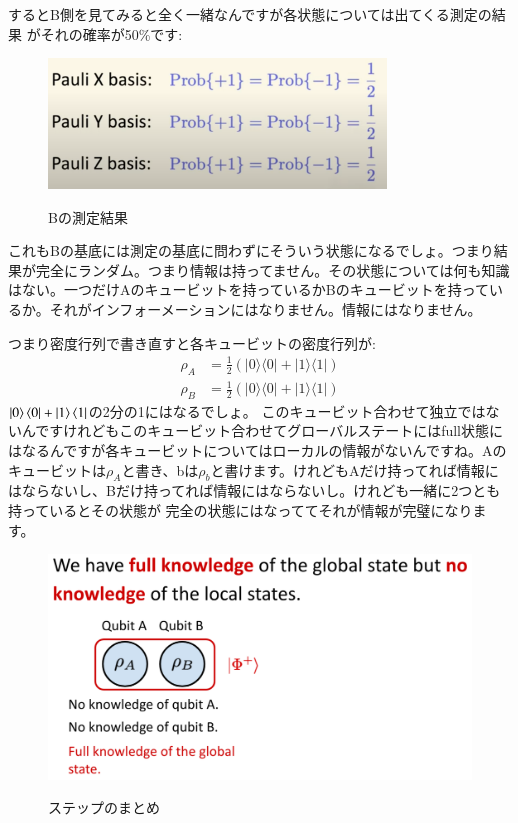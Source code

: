 するとB側を見てみると全く一緒なんですが各状態については出てくる測定の結果
がそれの確率が50\%です:
\begin{figure}[H]
    \centering
    \includegraphics[width=0.8\textwidth]{lesson4/Qubit_B.pdf}
    \label{fig: 1}
    \begin{center}
        \caption{Bの測定結果}
    \end{center}
\end{figure}
これもBの基底には測定の基底に問わずにそういう状態になるでしょ。つまり結果が完全にランダム。つまり情報は持ってません。その状態については何も知識はない。一つだけAのキュービットを持っているかBのキュービットを持っているか。それがインフォーメーションにはなりません。情報にはなりません。

つまり密度行列で書き直すと各キュービットの密度行列が:
\begin{equation}
\begin{aligned}
\rho_{A} &=\frac{1}{2}(|0\rangle\langle 0|+| 1\rangle\langle 1|) \\
\rho_{B} &=\frac{1}{2}(|0\rangle\langle 0|+| 1\rangle\langle 1|)
\end{aligned}
\end{equation}
$\ket{0}\bra{0}+\ket{1}\bra{1}$の2分の1にはなるでしょ。
このキュービット合わせて独立ではないんですけれどもこのキュービット合わせてグローバルステートにはfull状態にはなるんですが各キュービットについてはローカルの情報がないんですね。Aのキュービットは$\rho_{A}$と書き、bは$\rho_{b}$と書けます。けれどもAだけ持ってれば情報にはならないし、Bだけ持ってれば情報にはならないし。けれども一緒に2つとも持っているとその状態が
完全の状態にはなっててそれが情報が完璧になります。
\begin{figure}[H]
    \centering
    \includegraphics[width=1.0\textwidth]{lesson4/4.3_Recap.pdf}
    \label{fig: 1}
    \begin{center}
        \caption{ステップのまとめ}
    \end{center}
\end{figure}


